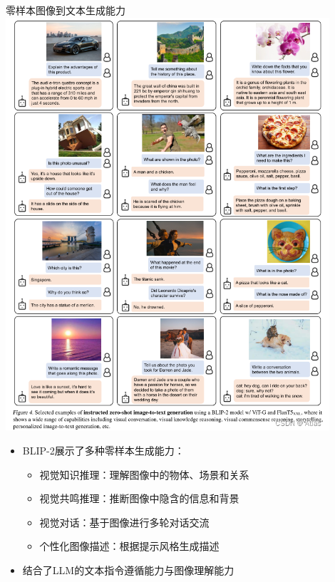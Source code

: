 \documentclass{beamer}
\begin{document}
  \begin{frame}{零样本图像到文本生成能力}
    \centering
    \includegraphics[width=0.9\textwidth]{table2.png}
    \vspace{0.2cm}
    
    \begin{itemize}
      \item BLIP-2展示了多种零样本生成能力：
        \begin{itemize}
          \item 视觉知识推理：理解图像中的物体、场景和关系
          \item 视觉共鸣推理：推断图像中隐含的信息和背景
          \item 视觉对话：基于图像进行多轮对话交流
          \item 个性化图像描述：根据提示风格生成描述
        \end{itemize}
      \item 结合了LLM的文本指令遵循能力与图像理解能力
    \end{itemize}
  \end{frame}
  
\end{document}
